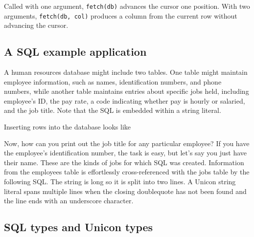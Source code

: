 
\noindent
Called with one argument, \texttt{fetch(db)} advances the cursor
one position. With two arguments, \texttt{fetch(db, col)} produces a
column from the current row without advancing the cursor.

\subsection{A SQL example application}

A human resources database might include two tables. One
table might maintain employee information, such as names,
identification numbers, and phone numbers, while another table
maintains entries about specific jobs held, including
employee's ID, the pay rate, a code indicating whether
pay is hourly or salaried, and the job title. Note that the SQL is
embedded within a string literal.


\noindent
Inserting rows into the database looks like


Now, how can you print out the job title for any particular employee? If
you have the employee's identification number, the
task is easy, but let's say you just have their name.
These are the kinds of jobs for which SQL was created. Information from
the employees table is effortlessly cross-referenced with the jobs
table by the following SQL. The string is long so it is split into
two lines. A Unicon string literal spans multiple lines when the
closing doublequote has not been found and the line ends with an
underscore character.


\subsection{SQL types and Unicon types}

